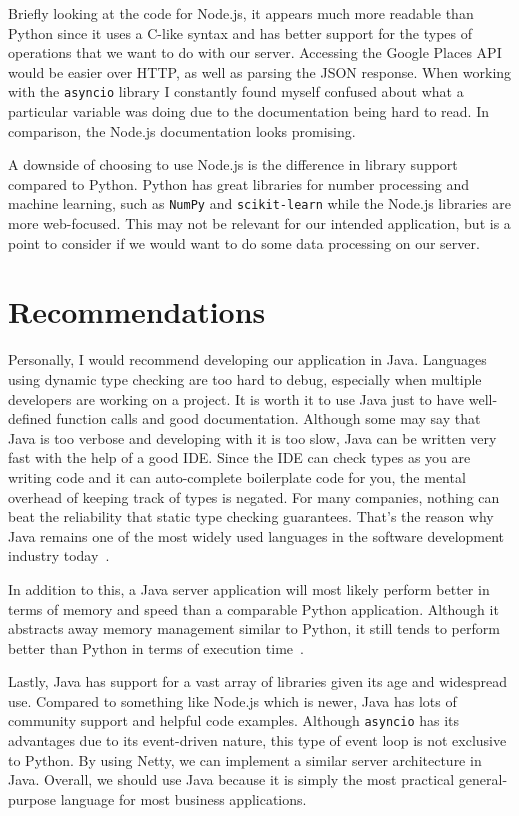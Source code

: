 \documentclass[letterpaper,twocolumn,10pt]{article}
\begin{document}
Briefly looking at the code for Node.js, it appears much more readable than Python since it uses a C-like syntax and has better support for the
types of operations that we want to do with our server. Accessing the Google Places API would be easier over HTTP, as well as parsing the JSON response.
When working with the \texttt{asyncio} library I constantly found myself confused about what a particular variable was doing due to the
documentation being hard to read. In comparison, the Node.js documentation looks promising.

A downside of choosing to use Node.js is the difference in library support compared to Python. Python has great libraries for number processing and
machine learning, such as \texttt{NumPy} and \texttt{scikit-learn} while the Node.js libraries are more web-focused. This may not be relevant for
our intended application, but is a point to consider if we would want to do some data processing on our server.

\section{Recommendations}

Personally, I would recommend developing our application in Java. Languages using dynamic type checking are too hard to debug, especially when
multiple developers are working on a project. It is worth it to use Java just to have well-defined function calls and good documentation.
Although some may say that Java is too verbose and developing with it is too slow, Java can be written very fast with the help of a good IDE.
Since the IDE can check types as you are writing code and it can auto-complete boilerplate code for you, the mental overhead of keeping track of types
is negated. For many companies, nothing can beat the reliability that static type checking guarantees. That's the reason why Java remains one of the
most widely used languages in the software development industry today~\cite{tiobe}.

In addition to this, a Java server application will most likely perform better in terms of memory and speed than a comparable Python application.
Although it abstracts away memory management similar to Python, it still tends to perform better than Python in terms of execution time~\cite{fourment2008}.

Lastly, Java has support for a vast array of libraries given its age and widespread use. Compared to something like Node.js which is newer, Java has lots
of community support and helpful code examples. Although \texttt{asyncio} has its advantages due to its event-driven nature, this type of event
loop is not exclusive to Python. By using Netty, we can implement a similar server architecture in Java. Overall, we should
use Java because it is simply the most practical general-purpose language for most business applications.
\end{document}
